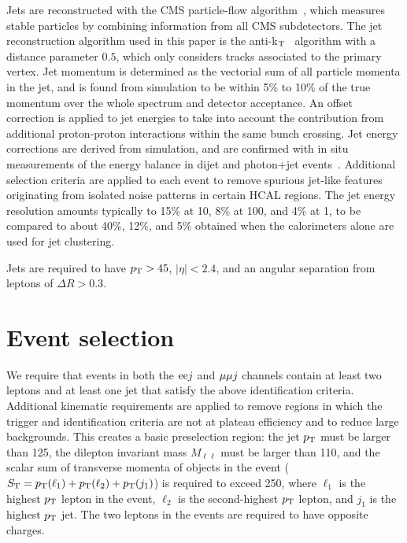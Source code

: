 Jets are reconstructed with the CMS particle-flow algorithm~\cite{CMS-PAS-PFT-09-001,CMS-PAS-PFT-10-001}, which measures
stable particles by combining information from all CMS subdetectors. The jet reconstruction algorithm used
in this paper is the anti-k$\rm _T$~\cite{Cacciari:2008gp,fastjetmanual} algorithm with a
distance parameter $0.5$, which only considers tracks associated to the primary vertex. Jet momentum is determined as the vectorial sum of all particle momenta in the jet, and is found from simulation to be within 5\% to 10\% of the true momentum over the whole \pt spectrum and detector acceptance.  An offset correction is applied to jet energies to take into account the contribution from additional proton-proton interactions within the same bunch crossing. Jet energy corrections are derived from simulation, and are confirmed with in situ measurements of the energy balance in dijet and photon+jet events~\cite{CMS-PAPERS-JME-10-011}. Additional selection criteria are applied to each event to remove spurious jet-like features originating from isolated noise patterns in certain HCAL regions.  The jet energy resolution amounts typically to 15\% at 10\GeV, 8\% at 100\GeV, and 4\% at 1\TeV, to be compared to about 40\%, 12\%, and 5\% obtained when the calorimeters alone are used for jet clustering.

Jets are required to have $p_{\mathrm{T}}>45$\GeV, $|\eta| < 2.4$, and an angular separation from leptons of $\Delta R > 0.3$.

\section{Event selection}
\label{selection}

We require that events in both the $\mathrm{e} \mathrm{e} j$ and ${\mu} {\mu} j$ channels contain at least two leptons and at least one jet that satisfy the above identification criteria.  Additional kinematic requirements are applied to remove regions in which the trigger and identification criteria are not at plateau efficiency and to reduce large backgrounds.  This creates a basic preselection region:  the jet $p_{\mathrm{T}}$ must be larger than 125\GeV, the dilepton invariant mass $M_{\ell\ell} $ must be larger than 110\GeV, and the scalar sum of transverse momenta of objects in the event ($S_{\mathrm{T}} = p_{\mathrm{T}}(\ell_1)+p_{\mathrm{T}}(\ell_2)+p_{\mathrm{T}}(j_1)$) is required to exceed 250\GeV, where $\ell_1$ is the highest $p_{\mathrm{T}}$ lepton in the event, $\ell_2$ is the second-highest $p_{\mathrm{T}}$ lepton, and $j_1$ is the highest $p_{\mathrm{T}}$ jet.  The two leptons in the events are required to have opposite charges.  

